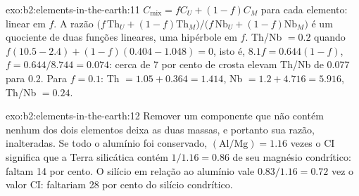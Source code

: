 \begin{solution}{exo:b2:elements-in-the-earth:11}
$C_{\mathrm{mix}} = fC_U + (1-f)C_M$ para cada elemento: linear em $f$. A razão
$\bigl(f\,\mathrm{Th}_U + (1-f)\mathrm{Th}_M\bigr)/\bigl(f\,\mathrm{Nb}_U +
(1-f)\mathrm{Nb}_M\bigr)$ é um quociente de duas funções lineares, uma hipérbole em $f$.
Th/Nb $= 0.2$ quando $f(10.5-2.4) + (1-f)(0.404-1.048) = 0$, isto é, $8.1f = 0.644(1-f)$,
$f = 0.644/8.744 = 0.074$: cerca de 7 por cento de crosta elevam Th/Nb de 0.077 para 0.2. Para
$f = 0.1$: Th $= 1.05 + 0.364 = 1.414$, Nb $= 1.2 + 4.716 = 5.916$, Th/Nb $= 0.24$.
\end{solution}

\begin{solution}{exo:b2:elements-in-the-earth:12}
Remover um componente que não contém nenhum dos dois elementos deixa as duas massas, e portanto sua razão,
inalteradas. Se todo o alumínio foi conservado, $(\mathrm{Al}/\mathrm{Mg}) = 1.16$ vezes o CI
significa que a Terra silicática contém $1/1.16 = 0.86$ de seu magnésio condrítico: faltam 14 por
cento. O silício em relação ao alumínio vale $0.83/1.16 = 0.72$ vez o valor CI:
faltariam 28 por cento do silício condrítico.
\end{solution}

